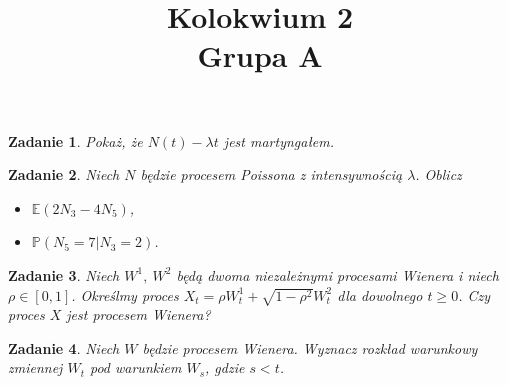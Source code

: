 \documentclass{mwart}
\title{Kolokwium 2\\Grupa A}
\newtheorem{zd}{Zadanie}
\begin{document}

\maketitle


\begin{zd}
Pokaż, że $N(t) - \lambda t$ jest martyngałem.
\end{zd}

\begin{zd}
Niech $N$ będzie procesem Poissona z intensywnością $\lambda$. Oblicz
\begin{itemize}
\item $\mathbb{E}(2N_3 - 4N_5)$,
\item $\mathbb{P}(N_5=7|N_3=2)$.
\end{itemize}
\end{zd}

\begin{zd}
Niech $W^1,\ W^2$ będą dwoma niezależnymi procesami Wienera i niech $\rho \in [0, 1]$. Określmy proces $X_t = \rho W_t^1 + \sqrt{1 - \rho^2}W^2_t$ dla dowolnego $t\geq 0$. Czy proces $X$ jest procesem Wienera?
\end{zd}

\begin{zd}
Niech $W$ będzie procesem Wienera. Wyznacz rozkład warunkowy zmiennej $W_t$ pod warunkiem $W_s$, gdzie $s<t$.
\end{zd}
\end{document}
